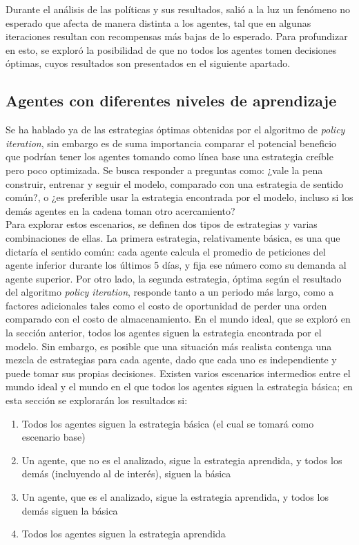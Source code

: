 Durante el an\'alisis de las pol\'iticas y sus resultados, sali\'o a la luz un fen\'omeno no esperado que afecta de manera distinta a los agentes, tal que en algunas iteraciones resultan con recompensas m\'as bajas de lo esperado. Para profundizar en esto, se explor\'o la posibilidad de que no todos los agentes tomen decisiones \'optimas, cuyos resultados son presentados en el siguiente apartado. \\

\subsection{Agentes con diferentes niveles de aprendizaje}

Se ha hablado ya de las estrategias \'optimas obtenidas por el algoritmo de \textit{policy iteration}, sin embargo es de suma importancia comparar el potencial beneficio que podr\'ian tener los agentes tomando como l\'inea base una estrategia cre\'ible pero poco optimizada. Se busca responder a preguntas como: ¿vale la pena construir, entrenar y seguir el modelo, comparado con una estrategia de sentido com\'un?, o ¿es preferible usar la estrategia encontrada por el modelo, incluso si los dem\'as agentes en la cadena toman otro acercamiento?\\

 Para explorar estos escenarios, se definen dos tipos de estrategias y varias combinaciones de ellas. La primera estrategia, relativamente b\'asica, es una que dictar\'ia el sentido com\'un: cada agente calcula el promedio de peticiones del agente inferior durante los \'ultimos 5 d\'ias, y fija ese n\'umero como su demanda al agente superior. Por otro lado, la segunda estrategia, \'optima seg\'un el resultado del algoritmo \textit{policy iteration}, responde tanto a un periodo m\'as largo, como a factores adicionales tales como el costo de oportunidad de perder una orden comparado con el costo de almacenamiento. En el mundo ideal, que se explor\'o en la secci\'on anterior, todos los agentes siguen la estrategia encontrada por el modelo. Sin embargo, es posible que una situaci\'on m\'as realista contenga una mezcla de estrategias para cada agente, dado que cada uno es independiente y puede tomar sus propias decisiones. Existen varios escenarios intermedios entre el mundo ideal y el mundo en el que todos los agentes siguen la estrategia b\'asica; en esta secci\'on se explorar\'an los resultados si:\\
 
 \begin{enumerate}
     \item Todos los agentes siguen la estrategia b\'asica (el cual se tomar\'a como escenario base)
     \item Un agente, que no es el analizado, sigue la estrategia aprendida, y todos los dem\'as (incluyendo al de inter\'es), siguen la b\'asica
     \item Un agente, que es el analizado, sigue la estrategia aprendida, y todos los dem\'as siguen la b\'asica
     \item Todos los agentes siguen la estrategia aprendida
 \end{enumerate}


